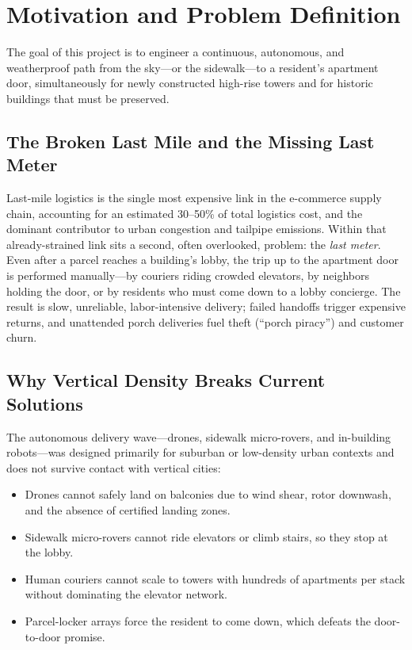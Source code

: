 \documentclass[11pt,a4paper]{report}
\begin{document}
\tableofcontents
\listoffigures
\listoftables

\chapter{Motivation and Problem Definition}
\label{ch:motivation}

The goal of this project is to engineer a continuous, autonomous, and
weatherproof path from the sky---or the sidewalk---to a resident's
apartment door, simultaneously for newly constructed high-rise towers and
for historic buildings that must be preserved.

\section{The Broken Last Mile and the Missing Last Meter}

Last-mile logistics is the single most expensive link in the e-commerce
supply chain, accounting for an estimated 30--50\% of total logistics
cost, and the dominant contributor to urban congestion and tailpipe
emissions. Within that already-strained link sits a second, often
overlooked, problem: the \emph{last meter}. Even after a parcel reaches a
building's lobby, the trip up to the apartment door is performed
manually---by couriers riding crowded elevators, by neighbors holding the
door, or by residents who must come down to a lobby concierge. The
result is slow, unreliable, labor-intensive delivery; failed handoffs
trigger expensive returns, and unattended porch deliveries fuel theft
(``porch piracy'') and customer churn.

\section{Why Vertical Density Breaks Current Solutions}

The autonomous delivery wave---drones, sidewalk micro-rovers, and
in-building robots---was designed primarily for suburban or low-density
urban contexts and does not survive contact with vertical cities:
\begin{itemize}
    \item Drones cannot safely land on balconies due to wind shear,
          rotor downwash, and the absence of certified landing zones.
    \item Sidewalk micro-rovers cannot ride elevators or climb stairs,
          so they stop at the lobby.
    \item Human couriers cannot scale to towers with hundreds of
          apartments per stack without dominating the elevator network.
    \item Parcel-locker arrays force the resident to come down, which
          defeats the door-to-door promise.
\end{itemize}
\end{document}
